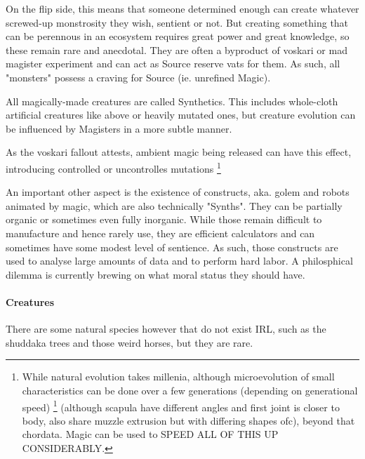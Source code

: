 On the flip side, this means that someone determined enough can create whatever screwed-up monstrosity they wish, sentient or not. But creating something that can be perennous in an ecosystem requires great power and great knowledge, so these remain rare and anecdotal. They are often a byproduct of voskari or mad magister experiment and can act as Source reserve vats for them. As such, all "monsters" possess a craving for Source (ie. unrefined Magic).


All magically-made creatures are called Synthetics. This includes whole-cloth artificial creatures like above or heavily mutated ones, but creature evolution can be influenced by Magisters in a more subtle manner.


As the voskari fallout attests, ambient magic being released can have this effect, introducing controlled or uncontrolles mutations \footnote{While natural evolution takes millenia, although microevolution of small characteristics can be done over a few generations (depending on generational speed)
\footnote{Quadrupeds will generally share a bone structure and muscle attachments, traces of which can be seen in fish even. Muscle attachments for the face are cheekbones and lower far mandible} (although scapula have different angles and first joint is closer to body, also share muzzle extrusion but with differing shapes ofc), beyond that chordata. Magic can be used to SPEED ALL OF THIS UP CONSIDERABLY.}

An important other aspect is the existence of constructs, aka. golem and robots animated by magic, which are also technically "Synths". They can be partially organic or sometimes even fully inorganic. While those remain difficult to manufacture and hence rarely use, they are efficient calculators and can sometimes have some modest level of sentience. As such, those constructs are used to analyse large amounts of data and to perform hard labor. A philosphical dilemma is currently brewing on what moral status they should have.







\paragraph{Creatures}


There are some natural species however that do not exist IRL, such as the shuddaka trees and those weird horses, but they are rare.




